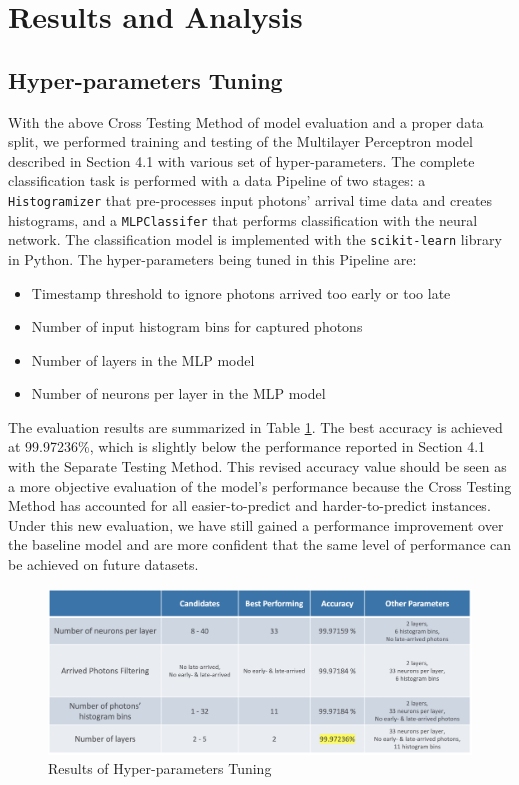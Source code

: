 \documentclass[letterpaper,twocolumn,10pt]{article}
\begin{document}
\section{Results and Analysis}

\subsection{Hyper-parameters Tuning}

With the above Cross Testing Method of model evaluation and a proper data split, we performed training and testing of the Multilayer Perceptron model described in Section 4.1 with various set of hyper-parameters. The complete classification task is performed with a data Pipeline of two stages: a \texttt{Histogramizer} that pre-processes input photons' arrival time data and creates histograms, and a \texttt{MLPClassifer} that performs classification with the neural network. The classification model is implemented with the \texttt{scikit-learn} library in Python. The hyper-parameters being tuned in this Pipeline are:

\begin{itemize}
    \item Timestamp threshold to ignore photons arrived too early or too late
    \item Number of input histogram bins for captured photons
    \item Number of layers in the MLP model
    \item Number of neurons per layer in the MLP model
\end{itemize}

The evaluation results are summarized in Table \ref{table:params_tuning}. The best accuracy is achieved at 99.97236\%, which is slightly below the performance reported in Section 4.1 with the Separate Testing Method. This revised accuracy value should be seen as a more objective evaluation of the model's performance because the Cross Testing Method has accounted for all easier-to-predict and harder-to-predict instances. Under this new evaluation, we have still gained a performance improvement over the baseline model and are more confident that the same level of performance can be achieved on future datasets. 

\begin{figure}[]
    \includegraphics[width=2\columnwidth]{Figures/params_tuning.png}
    \centering
    \caption{Results of Hyper-parameters Tuning}
    \label{table:params_tuning}
\end{figure}
\end{document}
